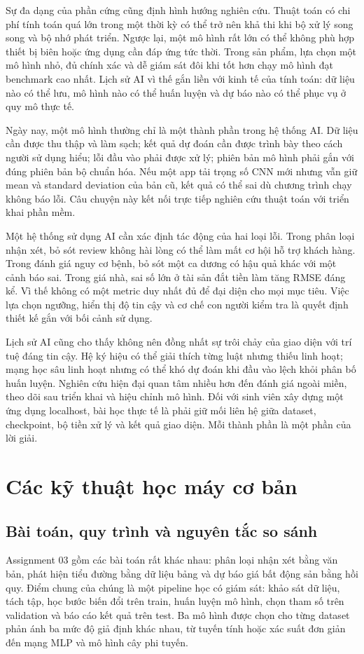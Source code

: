 \documentclass[12pt,a4paper]{report}
\begin{document}
Sự đa dạng của phần cứng cũng định hình hướng nghiên cứu. Thuật toán có chi phí tính toán quá lớn trong một thời kỳ có thể trở nên khả thi khi bộ xử lý song song và bộ nhớ phát triển. Ngược lại, một mô hình rất lớn có thể không phù hợp thiết bị biên hoặc ứng dụng cần đáp ứng tức thời. Trong sản phẩm, lựa chọn một mô hình nhỏ, đủ chính xác và dễ giám sát đôi khi tốt hơn chạy mô hình đạt benchmark cao nhất. Lịch sử AI vì thế gắn liền với kinh tế của tính toán: dữ liệu nào có thể lưu, mô hình nào có thể huấn luyện và dự báo nào có thể phục vụ ở quy mô thực tế.

Ngày nay, một mô hình thường chỉ là một thành phần trong hệ thống AI. Dữ liệu cần được thu thập và làm sạch; kết quả dự đoán cần được trình bày theo cách người sử dụng hiểu; lỗi đầu vào phải được xử lý; phiên bản mô hình phải gắn với đúng phiên bản bộ chuẩn hóa. Nếu một app tải trọng số CNN mới nhưng vẫn giữ mean và standard deviation của bản cũ, kết quả có thể sai dù chương trình chạy không báo lỗi. Câu chuyện này kết nối trực tiếp nghiên cứu thuật toán với triển khai phần mềm.

Một hệ thống sử dụng AI cần xác định tác động của hai loại lỗi. Trong phân loại nhận xét, bỏ sót review không hài lòng có thể làm mất cơ hội hỗ trợ khách hàng. Trong đánh giá nguy cơ bệnh, bỏ sót một ca dương có hậu quả khác với một cảnh báo sai. Trong giá nhà, sai số lớn ở tài sản đắt tiền làm tăng RMSE đáng kể. Vì thế không có một metric duy nhất đủ để đại diện cho mọi mục tiêu. Việc lựa chọn ngưỡng, hiển thị độ tin cậy và cơ chế con người kiểm tra là quyết định thiết kế gắn với bối cảnh sử dụng.

Lịch sử AI cũng cho thấy không nên đồng nhất sự trôi chảy của giao diện với trí tuệ đáng tin cậy. Hệ ký hiệu có thể giải thích từng luật nhưng thiếu linh hoạt; mạng học sâu linh hoạt nhưng có thể khó dự đoán khi đầu vào lệch khỏi phân bố huấn luyện. Nghiên cứu hiện đại quan tâm nhiều hơn đến đánh giá ngoài miền, theo dõi sau triển khai và hiệu chỉnh mô hình. Đối với sinh viên xây dựng một ứng dụng localhost, bài học thực tế là phải giữ mối liên hệ giữa dataset, checkpoint, bộ tiền xử lý và kết quả giao diện. Mỗi thành phần là một phần của lời giải.

\chapter{Các kỹ thuật học máy cơ bản}\label{ch:ml}
\section{Bài toán, quy trình và nguyên tắc so sánh}
Assignment 03 gồm các bài toán rất khác nhau: phân loại nhận xét bằng văn bản, phát hiện tiểu đường bằng dữ liệu bảng và dự báo giá bất động sản bằng hồi quy. Điểm chung của chúng là một pipeline học có giám sát: khảo sát dữ liệu, tách tập, học bước biến đổi trên train, huấn luyện mô hình, chọn tham số trên validation và báo cáo kết quả trên test. Ba mô hình được chọn cho từng dataset phản ánh ba mức độ giả định khác nhau, từ tuyến tính hoặc xác suất đơn giản đến mạng MLP và mô hình cây phi tuyến.
\end{document}
